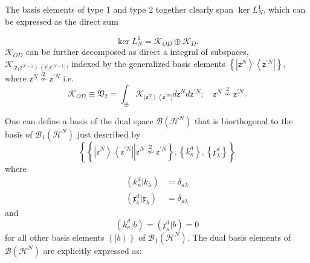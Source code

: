 \documentclass[aps,preprint]{revtex4}%
\begin{document}
The basis elements of type 1 and type 2 together clearly span $\ker L_{N}^{1}
$, which can be expressed as the direct sum%

\begin{equation}
\ker L_{N}^{1}=\mathcal{K}_{OD}\oplus\mathcal{K}_{D}.
\end{equation}
$\mathcal{K}_{OD}$ can be further decomposed as direct a integral
\cite{dirint} of subspaces, $\mathcal{K}_{\left\vert \mathsf{z}_{1}%
\mathsf{z}^{N-1}\right\rangle \left\langle \mathsf{z}_{1}^{\prime}%
\mathsf{z}^{\prime N-1}\right\vert }$, indexed by the generalized basis
elements $\left\{  \left\vert \mathsf{z}^{N}\right\rangle \left\langle
\mathsf{z}^{\prime N}\right\vert \right\}  $, where $\mathsf{z}^{N}\overset
{2}{\nsim}\mathsf{z}^{\prime N}$ i.e.
\begin{equation}
\mathcal{K}_{OD}\equiv\mathfrak{V}_{2}=\int_{\oplus}\mathcal{K}_{\left\vert
\mathsf{z}^{N}\right\rangle \left\langle \mathsf{z}^{\prime N}\right\vert
}d\mathsf{z}^{N}d\mathsf{z}^{\prime N};\quad\mathsf{z}^{N}\overset{2}{\nsim
}\mathsf{z}^{\prime N}.
\end{equation}


One can define a basis of the dual space $\mathcal{B}\left(  \mathcal{H}%
^{N}\right)  $ that is biorthogonal to the basis of $\mathcal{B}_{1}\left(
\mathcal{H}^{N}\right)  $ just described by%
\begin{equation}
\left\{  \left\{  \left\vert \mathsf{z}^{N}\right\rangle \left\langle
\mathsf{z}^{\prime N}\right\vert \left\vert \mathsf{z}^{N}\overset{2}{\nsim
}\mathsf{z}^{\prime N}\right.  \right\}  ,\left\{  k_{\kappa}^{d}\right\}
,\left\{  \mathfrak{x}_{\lambda}^{d}\right\}  \right\}
\end{equation}
where
\begin{align}
\left(  k_{\kappa}^{d}|k_{\lambda}\right)   &  =\delta_{\kappa\lambda
}\nonumber\\
\left(  \mathfrak{x}_{\kappa}^{d}|\mathfrak{x}_{\lambda}\right)   &
=\delta_{\kappa\lambda}%
\end{align}
and
\begin{equation}
\left(  k_{\kappa}^{d}|b\right)  =\left(  \mathfrak{x}_{\kappa}^{d}|b\right)
=0
\end{equation}
for all other basis elements $\left\{  \left\vert b\right)  \right\}  $ of
$\mathcal{B}_{1}\left(  \mathcal{H}^{N}\right)  .$ The dual basis elements of
$\mathcal{B}\left(  \mathcal{H}^{N}\right)  $ are explicitly expressed as:
\end{document}
